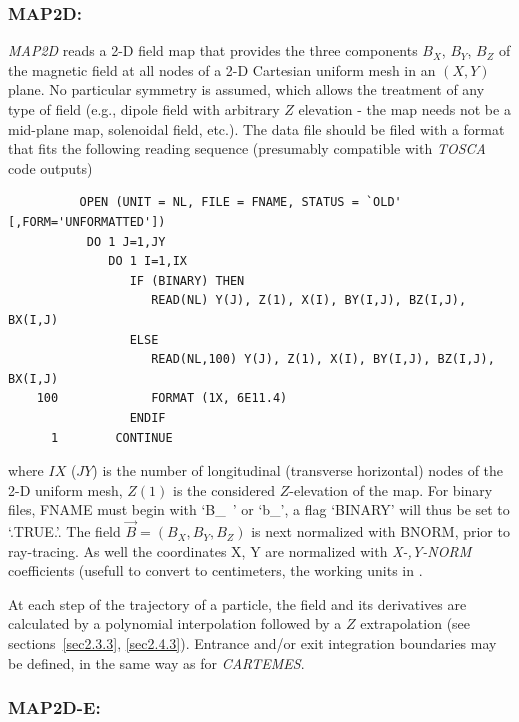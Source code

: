\subsubsection*{MAP2D: \MAPTwoDTitl~\cite{Pavel}} \label{MAP2D} 
\medskip

\textsl{MAP2D} reads a 2-D field map that provides the three
components $ B_X$, $ B_Y $, $ B_Z $ of the magnetic field at all nodes of a 2-D Cartesian 
uniform mesh in an $(X,Y)$ plane. 
No particular symmetry is assumed, which allows the 
treatment of any type of field (e.g., dipole field  with arbitrary $Z$ elevation 
- the map needs not be a mid-plane map, solenoidal field, etc.). The data file should be filed with a 
format that fits the following \FORTRAN reading sequence (presumably compatible 
with \textsl{TOSCA} code outputs) 

{\footnotesize
\begin{verbatim}
	      OPEN (UNIT = NL, FILE = FNAME, STATUS = `OLD' [,FORM='UNFORMATTED'])
	       DO 1 J=1,JY 
	          DO 1 I=1,IX
	             IF (BINARY) THEN
	                READ(NL) Y(J), Z(1), X(I), BY(I,J), BZ(I,J), BX(I,J)
	             ELSE
	                READ(NL,100) Y(J), Z(1), X(I), BY(I,J), BZ(I,J), BX(I,J)
	100             FORMAT (1X, 6E11.4)
	             ENDIF
      1        CONTINUE
\end{verbatim}}
\medskip

\noindent where $IX$ ($JY$) is the number of longitudinal (transverse horizontal) nodes of 
the 2-D uniform mesh, $Z(1) $ is the considered $Z$-elevation of the map. For 
binary files, FNAME must begin with \mbox{`B\_ '} or  \mbox{`b\_'}, a flag `BINARY' will thus be 
set to `.TRUE.'. The field $ \vec  B=(B_X,B_Y,B_Z )$ is next normalized with 
BNORM, prior to ray-tracing.  As well the  coordinates  X, Y are normalized with 
  \textsl{X-,Y-NORM} coefficients (usefull to convert to centimeters, the working units in  \zgoubi. 


\bigskip

\noindent At each step of the trajectory of a particle, the field and its 
derivatives are calculated by a polynomial interpolation followed 
by a $ Z $ extrapolation (see sections~\ref{sec2.3.3}, \ref{sec2.4.3}). Entrance and/or 
exit integration boundaries may be defined, in the same way as for \textsl{CARTEMES}.


\newpage

\subsubsection*{MAP2D-E: \MAPTwoDETitl} \label{MAP2D-E} 
\medskip

